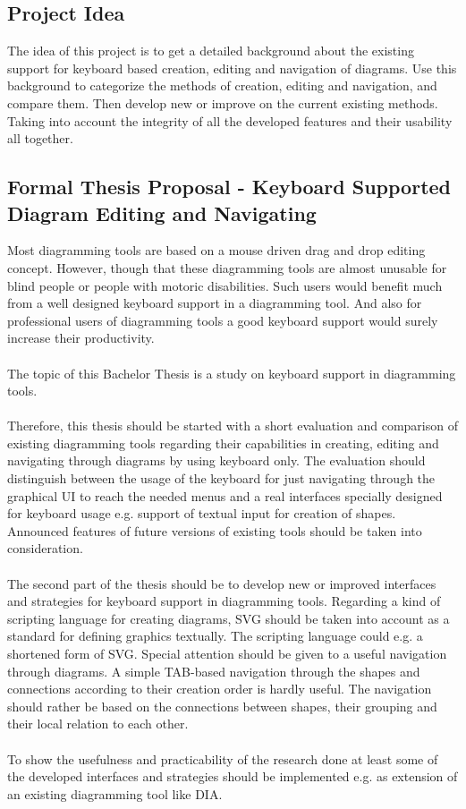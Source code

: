 \subsection{Project Idea}
The idea of this project is to get a detailed background about the existing support for keyboard based creation, editing and navigation of diagrams. Use this background to categorize the methods of creation, editing and navigation, and compare them. Then develop new or improve on the current existing methods. Taking into account the integrity of all the developed features and their usability all together.

\subsection{Formal Thesis Proposal - Keyboard Supported Diagram Editing and Navigating}
Most diagramming tools are based on a mouse driven drag and drop editing concept. However, though that these diagramming tools are almost unusable for blind people or people with motoric disabilities. Such users would benefit much from a well designed keyboard support in a diagramming tool. And also for professional users of diagramming tools a good keyboard support would surely increase their productivity.

\paragraph{}
The topic of this Bachelor Thesis is a study on keyboard support in diagramming tools.

\paragraph{}
Therefore, this thesis should be started with a short evaluation and comparison of existing diagramming tools regarding their capabilities in creating, editing and navigating through diagrams by using keyboard only. The evaluation should distinguish between the usage of the keyboard for just navigating through the graphical UI to reach the needed menus and a real interfaces specially designed for keyboard usage e.g. support of textual input for creation of shapes. Announced features of future versions of existing tools should be taken into consideration.

\paragraph{}
The second part of the thesis should be to develop new or improved interfaces and strategies for keyboard support in diagramming tools. Regarding a kind of scripting language for creating diagrams, SVG should be taken into account as a standard for defining graphics textually. The scripting language could e.g. a shortened form of SVG. Special attention should be given to a useful navigation through diagrams. A simple TAB-based navigation through the shapes and connections according to their creation order is hardly useful. The navigation should rather be based on the connections between shapes, their grouping and their local relation to each other.

\paragraph{}
To show the usefulness and practicability of the research done at least some of the developed interfaces and strategies should be implemented e.g. as extension of an existing diagramming tool like DIA.
